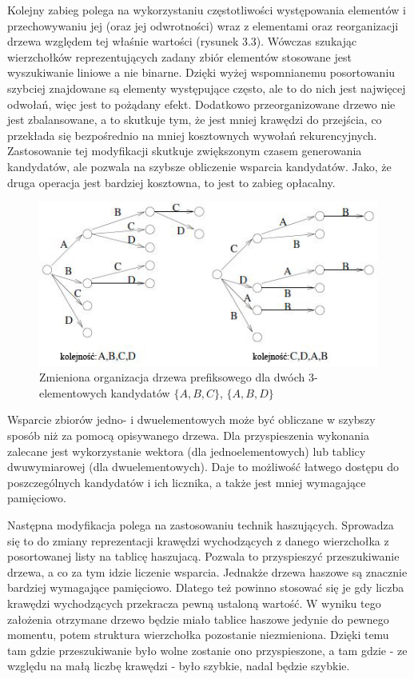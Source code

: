 Kolejny zabieg polega na wykorzystaniu częstotliwości występowania elementów i przechowywaniu jej (oraz jej odwrotności) wraz z elementami oraz reorganizacji drzewa względem tej właśnie wartości (rysunek 3.3). Wówczas szukając wierzchołków reprezentujących zadany zbiór elementów stosowane jest wyszukiwanie liniowe a nie binarne. Dzięki wyżej wspomnianemu posortowaniu szybciej znajdowane są elementy występujące często, ale to do nich jest najwięcej odwołań, więc jest to pożądany efekt. Dodatkowo przeorganizowane drzewo nie jest zbalansowane, a to skutkuje tym, że jest mniej krawędzi do przejścia, co przekłada się bezpośrednio na mniej kosztownych wywołań rekurencyjnych. Zastosowanie tej modyfikacji skutkuje zwiększonym czasem generowania kandydatów, ale pozwala na szybsze obliczenie wsparcia kandydatów. Jako, że druga operacja jest bardziej kosztowna, to jest to zabieg opłacalny.
\begin{figure}[h]
	\centering
	\includegraphics[width=0.8\linewidth]{figures/reorderedTreeBodon}
	\caption[Rysunek 3.3]{Zmieniona organizacja drzewa prefiksowego dla dwóch 3-elementowych kandydatów \(\{A, B, C\}\), \(\{A, B, D\}\)}
	\label{fig:reorderedTreeBodon}
\end{figure}


Wsparcie zbiorów jedno- i dwuelementowych może być obliczane w szybszy sposób niż za pomocą opisywanego drzewa. Dla przyspieszenia wykonania zalecane jest wykorzystanie wektora (dla jednoelementowych) lub tablicy dwuwymiarowej (dla dwuelementowych). Daje to możliwość łatwego dostępu do poszczególnych kandydatów i ich licznika, a także jest mniej wymagające pamięciowo. 

Następna modyfikacja polega na zastosowaniu technik haszujących. Sprowadza się to do zmiany reprezentacji krawędzi wychodzących z danego wierzchołka z posortowanej listy na tablicę haszujacą. Pozwala to przyspieszyć przeszukiwanie drzewa, a co za tym idzie liczenie wsparcia. Jednakże drzewa haszowe są znacznie bardziej wymagające pamięciowo. Dlatego też powinno stosować się je gdy liczba krawędzi wychodzących przekracza pewną ustaloną wartość. W wyniku tego założenia otrzymane drzewo będzie miało tablice haszowe jedynie do pewnego momentu, potem struktura wierzchołka pozostanie niezmieniona. Dzięki temu tam gdzie przeszukiwanie było wolne zostanie ono przyspieszone, a tam gdzie - ze względu na małą liczbę krawędzi - było szybkie, nadal będzie szybkie. 

